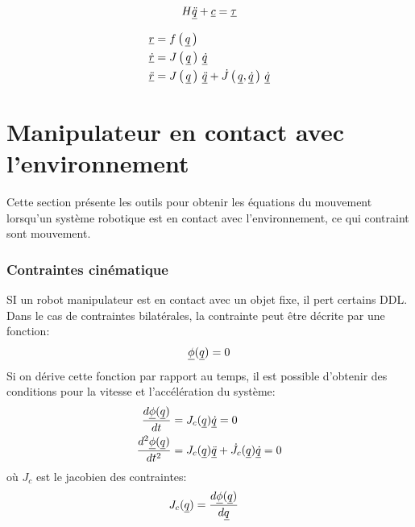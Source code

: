 \begin{align}
H \underline{\ddot{q}} + \underline{c} = \underline{\tau} 
\label{eq:manipulator_short2}
\end{align}

\begin{align}
\underline{r} &= f\left( \, \underline{q} \, \right) \\
\underline{\dot{r}} &= J\left( \, \underline{q} \, \right) \, \underline{\dot{q}} \\
\underline{\ddot{r}} &= J\left( \, \underline{q} \, \right) \, \underline{\ddot{q}}  + \dot{J} \left( \, \underline{q}  , \underline{\dot{q}} \, \right) \, \underline{\dot{q}} 
\end{align}


\newpage
\section{Manipulateur en contact avec l'environnement}
\label{sec:contact}

Cette section présente les outils pour obtenir les équations du mouvement lorsqu'un système robotique est en contact avec l'environnement, ce qui contraint sont mouvement. 

\subsubsection{Contraintes cinématique}
\label{sec:constraints}
%
SI un robot manipulateur est en contact avec un objet fixe, il pert certains DDL. Dans le cas de contraintes bilatérales, la contrainte peut être décrite par une fonction:
\begin{align}
\underline{\phi}( \underline{ q } ) = 0
\label{eq:constraint}
\end{align}
%
Si on dérive cette fonction par rapport au temps, il est possible d'obtenir des conditions pour la vitesse et l'accélération du système:
\begin{align}
\frac{d \underline{\phi}( \underline{ q } ) }{dt}     &= J_c( \underline{ q } ) \underline{\dot{q}}  = 0 \\
\frac{d^2 \underline{\phi}( \underline{ q } ) }{dt^2} &= J_c( \underline{ q } ) \underline{\ddot{q}}  + \dot{J}_c( \underline{ q } ) \underline{\dot{q}} = 0 
\label{eq:constraint_diff}
\end{align}
%
où $J_c$ est le jacobien des contraintes:
%
\begin{align}
J_c( \underline{ q } )                    &= \frac{d \underline{\phi}( \underline{ q } ) }{d\underline{ q }}
\label{eq:constraint_jaco}
\end{align}

